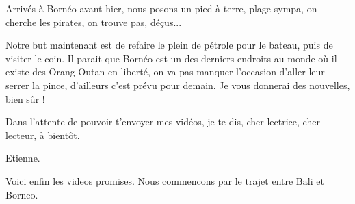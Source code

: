 \begin{multicols}{2}
Arrivés à Bornéo avant hier, nous posons un pied à terre, plage sympa, on cherche les pirates, on trouve pas, déçus...

Notre but maintenant est de refaire le plein de pétrole pour le bateau, puis de visiter le coin. Il parait que Bornéo est un des derniers endroits au monde où il existe des Orang Outan en liberté, on va pas manquer l'occasion d'aller leur serrer la pince, d'ailleurs c'est prévu pour demain. Je vous donnerai des nouvelles, bien sûr !

Dans l'attente de pouvoir t'envoyer mes vidéos, je te dis, cher lectrice, cher lecteur, à bientôt.

Etienne.

Voici enfin les videos promises. Nous commencons par le trajet entre Bali et Borneo.






\end{multicols}


